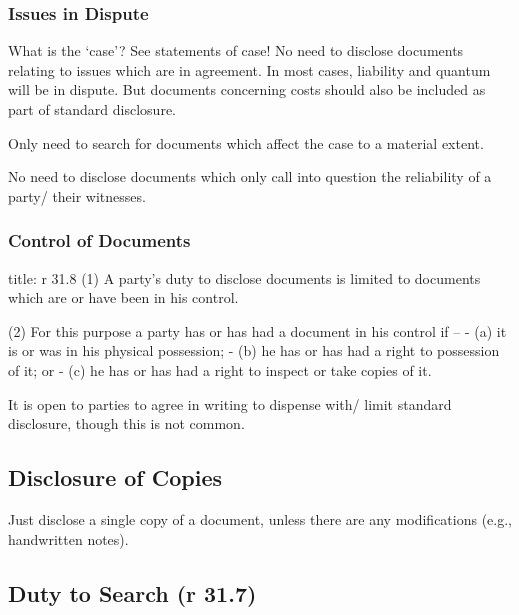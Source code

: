 \documentclass[
]{article}
\newenvironment{Shaded}{}{}
\newcommand{\NormalTok}[1]{#1}
\begin{document}
\hypertarget{issues-in-dispute}{%
\subsubsection{Issues in Dispute}\label{issues-in-dispute}}

What is the `case'? See statements of case! No need to disclose
documents relating to issues which are in agreement. In most cases,
liability and quantum will be in dispute. But documents concerning costs
should also be included as part of standard disclosure.

Only need to search for documents which affect the case to a material
extent.

No need to disclose documents which only call into question the
reliability of a party/ their witnesses.

\hypertarget{control-of-documents}{%
\subsubsection{Control of Documents}\label{control-of-documents}}

\begin{Shaded}
\begin{Highlighting}[]
\NormalTok{title: r 31.8}
\NormalTok{(1) A party’s duty to disclose documents is limited to documents which are or have been in his control.}

\NormalTok{(2) For this purpose a party has or has had a document in his control if –}
\NormalTok{{-} (a) it is or was in his physical possession;}
\NormalTok{{-} (b) he has or has had a right to possession of it; or}
\NormalTok{{-} (c) he has or has had a right to inspect or take copies of it.}
\end{Highlighting}
\end{Shaded}

It is open to parties to agree in writing to dispense with/ limit
standard disclosure, though this is not common.

\hypertarget{disclosure-of-copies}{%
\subsection{Disclosure of Copies}\label{disclosure-of-copies}}

Just disclose a single copy of a document, unless there are any
modifications (e.g., handwritten notes).

\hypertarget{duty-to-search-r-31.7}{%
\subsection{Duty to Search (r 31.7)}\label{duty-to-search-r-31.7}}
\end{document}
